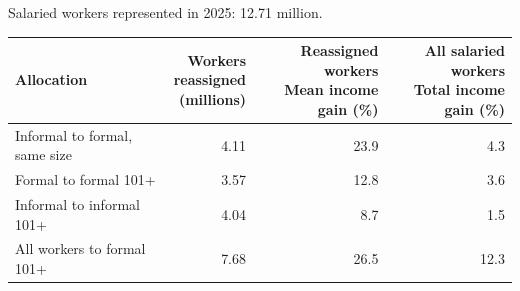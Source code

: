 {\small Salaried workers represented in 2025: 12.71 million.\par}
\vspace{0.2cm}
\begin{tabular}{p{}rrr}
\toprule
Allocation & \shortstack{Workers\\reassigned\\(millions)} & \shortstack{Reassigned workers\\Mean income\\gain (\%)} & \shortstack{All salaried workers\\Total income\\gain (\%)} \\
\midrule
Informal to formal, same size & 4.11 & 23.9 & 4.3 \\
Formal to formal 101+ & 3.57 & 12.8 & 3.6 \\
Informal to informal 101+ & 4.04 & 8.7 & 1.5 \\
\midrule
All workers to formal 101+ & 7.68 & 26.5 & 12.3 \\
\bottomrule\end{tabular}
